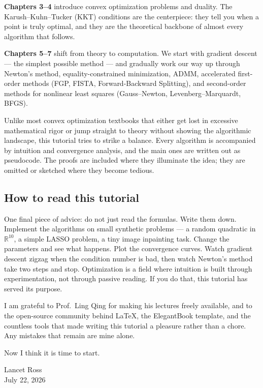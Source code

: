 \documentclass[lang=en,color=blue,mode=fancy,titlestyle=hang]{elegantbook}
\begin{document}
\textbf{Chapters 3–4} introduce convex optimization problems and duality. The Karush–Kuhn–Tucker
(KKT) conditions are the centerpiece: they tell you when a point is truly optimal, and they
are the theoretical backbone of almost every algorithm that follows.

\textbf{Chapters 5–7} shift from theory to computation. We start with gradient descent —
the simplest possible method — and gradually work our way up through Newton's method,
equality-constrained minimization, ADMM, accelerated first-order methods (FGP, FISTA,
Forward-Backward Splitting), and second-order methods for nonlinear least squares
(Gauss–Newton, Levenberg–Marquardt, BFGS).

Unlike most convex optimization textbooks that either get lost in excessive mathematical rigor
or jump straight to theory without showing the algorithmic landscape, this tutorial tries to strike
a balance. Every algorithm is accompanied by intuition and convergence analysis, and the
main ones are written out as pseudocode. The proofs are included where they illuminate
the idea; they are omitted or sketched where they become tedious.

\subsection*{How to read this tutorial}

One final piece of advice: do not just read the formulas. Write them down. Implement the
algorithms on small synthetic problems — a random quadratic in $\mathbb{R}^{10}$, a simple
LASSO problem, a tiny image inpainting task. Change the parameters and see what happens.
Plot the convergence curves. Watch gradient descent zigzag when the condition number is bad,
then watch Newton's method take two steps and stop. Optimization is a field where intuition
is built through experimentation, not through passive reading. If you do that, this tutorial has
served its purpose.

I am grateful to Prof.\ Ling Qing for making his lectures freely available, and to the open-source
community behind \LaTeX, the ElegantBook template, and the countless tools that made writing
this tutorial a pleasure rather than a chore. Any mistakes that remain are mine alone.

Now I think it is time to start.

\begin{flushright}
  Lancet Ross\\
  July 22, 2026
\end{flushright}
\end{document}
